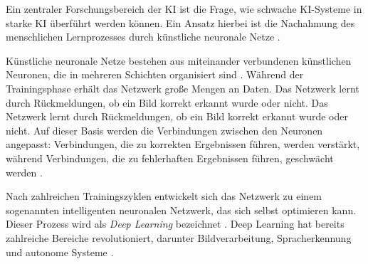Ein zentraler Forschungsbereich der KI ist die Frage, wie schwache KI-Systeme in starke KI überführt werden können. Ein Ansatz hierbei ist die Nachahmung des menschlichen Lernprozesses durch künstliche neuronale Netze \cite{Funk.2022}.

Künstliche neuronale Netze bestehen aus miteinander verbundenen künstlichen Neuronen, die in mehreren Schichten organisiert sind \cite{Lammel.2023}. Während der Trainingsphase erhält das Netzwerk große Mengen an Daten. Das Netzwerk lernt durch Rückmeldungen, ob ein Bild korrekt erkannt wurde oder nicht. Das Netzwerk lernt durch Rückmeldungen, ob ein Bild korrekt erkannt wurde oder nicht. Auf dieser Basis werden die Verbindungen zwischen den Neuronen angepasst: Verbindungen, die zu korrekten Ergebnissen führen, werden verstärkt, während Verbindungen, die zu fehlerhaften Ergebnissen führen, geschwächt werden \cite{Lammel.2023}.

Nach zahlreichen Trainingszyklen entwickelt sich das Netzwerk zu einem sogenannten intelligenten neuronalen Netzwerk, das sich selbst optimieren kann. Dieser Prozess wird als \emph{Deep Learning} bezeichnet \cite{Lammel.2023}. Deep Learning hat bereits zahlreiche Bereiche revolutioniert, darunter Bildverarbeitung, Spracherkennung und autonome Systeme \cite{Lammel.2023}.
